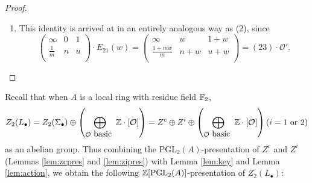 \documentclass[12pt]{amsart}
\theoremstyle{definition}
\newcommand{\F}[1]{\Bbb{F}_{#1}}
\newcommand{\Z}{\Bbb{Z}}
\newcommand{\oct}{\mathcal{O}}%
\newcommand{\cyc}[1]{\left[ #1\right]} %
\newcommand{\scyc}[1]{\left[ #1 \right]} %
\newcommand{\pgl}[2]{\mathrm{PGL}_{#1}(#2)}
\newcommand{\<}{\langle}
\renewcommand{\>}{\rangle}
\begin{document}
\begin{proof}
\begin{enumerate}
 Finally, we have 
\begin{eqnarray*}
\cyc{\oct}&=& \cyc{
\begin{array}{lll}
\frac{1}{1+w}& 0&\frac{1}{w}\\
\frac{u}{1+uw}&\frac{n}{1+nw}&\frac{1}{w+m}\\
\end{array}
}\\
&=&  \cyc{
\begin{array}{lll}
\frac{1}{1+w}& 0&1\\
\frac{u}{1+uw}&\frac{n}{1+nw}&\frac{1}{w+m}\\
\end{array}
}-
 \cyc{
\begin{array}{lll}
\frac{1}{1+w}& 0&1\\
\frac{u}{1+uw}&\frac{n}{1+nw}&\frac{1}{w}\\
\end{array}
}\\
&=& \left(\scyc{\frac{u}{1+uw}\ \frac{n}{1+nw}\ \frac{1}{w+m}}-\scyc{\frac{1}{1+w}\ \frac{n}{1+nw}\ \frac{1}{w+m}}\right)\\
&&- \left( \scyc{\frac{u}{1+uw}\ \frac{n}{1+nw}\ \frac{1}{w}}-\scyc{\frac{1}{1+w}\ \frac{n}{1+nw}\ \frac{1}{w}} \right)
\end{eqnarray*}
using Lemma \ref{lem:oct1} (2) twice.
\item This identity is arrived at in an entirely analogous way as  (2), since
\[
\left(
\begin{array}{lll}
\infty&0&1\\
\frac{1}{m}&n&u\\
\end{array}
\right)
\cdot E_{21}(w)=
\left(
\begin{array}{lll}
\infty&w&{1+w}\\
\frac{1+mw}{m}&n+w&u+w\\
\end{array}
\right)
=(2 3)\cdot \oct'.
\]
\end{enumerate}
\end{proof}



Recall that when  $A$ is a local ring with residue field $\F{2}$,
\[
Z_2(L_\bullet)=Z_2(\Sigma_\bullet)\oplus\left( \bigoplus_{\oct \mbox{ basic }}\Z\cdot\scyc{\oct}\right)=Z^c\oplus Z^i\oplus \left( \bigoplus_{\oct \mbox{ basic }}\Z\cdot\scyc{\oct}\right)
\mbox{($i=1$ or $2$)}
\]
as an abelian group. Thus combining the $\pgl{2}{A}$-presentation of $Z^c$ and $Z^i$  (Lemmas \ref{lem:zcpres} and \ref{lem:zipres}) with Lemma \ref{lem:key} and Lemma \ref{lem:action},
we obtain the following $\Z[\pgl{2}{A}]$-presentation of $Z_2(L_\bullet)$:
\end{document}

